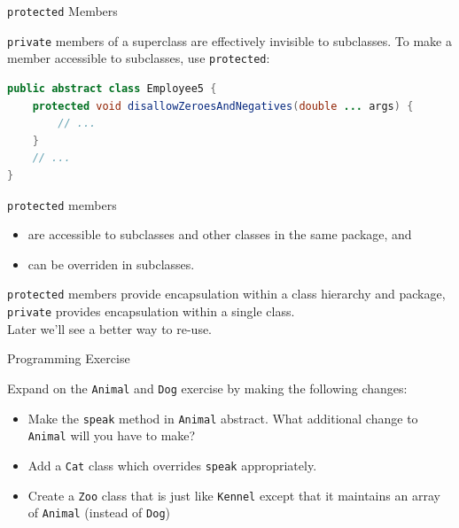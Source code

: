 \documentclass{beamer}
\begin{document}


\begin{frame}[fragile]{{\tt protected} Members}


{\tt private} members of a superclass are effectively invisible to subclasses.  To make a member accessible to subclasses, use {\tt protected}:
\begin{lstlisting}[language=Java]
public abstract class Employee5 {
    protected void disallowZeroesAndNegatives(double ... args) {
        // ...
    }
    // ...
}
\end{lstlisting}
{\tt protected} members
\begin{itemize}
\item are accessible to subclasses and other classes in the same package, and
\item can be overriden in subclasses.
\end{itemize}
{\tt protected} members provide encapsulation within a class hierarchy and package, {\tt private} provides encapsulation within a single class.\\
\vspace{.05in}
Later we'll see a better way to re-use.
\end{frame}

\begin{frame}[fragile]{Programming Exercise}


Expand on the {\tt Animal} and {\tt Dog} exercise by making the following changes:
\begin{itemize}
\item Make the {\tt speak} method in {\tt Animal} abstract.  What additional change to {\tt Animal} will you have to make?
\item Add a {\tt Cat} class which overrides {\tt speak} appropriately.
\item Create a {\tt Zoo} class that is just like {\tt Kennel} except that it
 maintains an array of {\tt Animal} (instead of {\tt Dog})
\end{itemize}


\end{frame}








\end{document}

